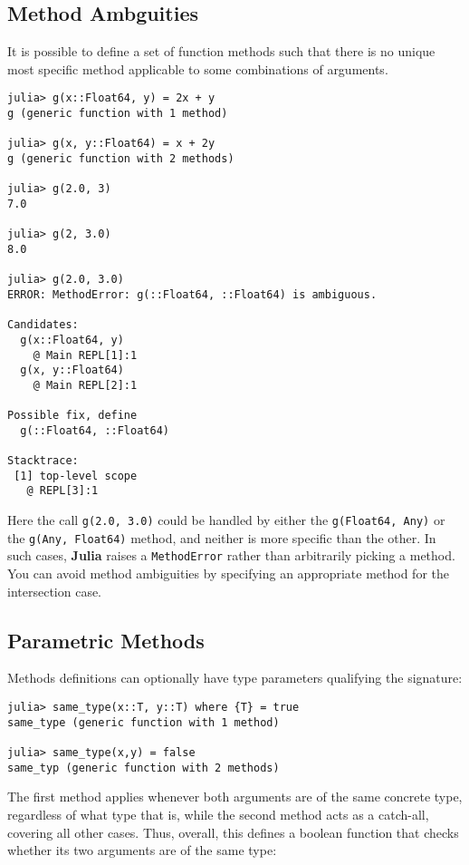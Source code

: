 \documentclass[
]{article}
\begin{document}
\hypertarget{method-ambguities}{%
\subsection{Method Ambguities}\label{method-ambguities}}

It is possible to define a set of function methods such that there is no
unique most specific method applicable to some combinations of
arguments.

\begin{verbatim}
julia> g(x::Float64, y) = 2x + y
g (generic function with 1 method)

julia> g(x, y::Float64) = x + 2y
g (generic function with 2 methods)

julia> g(2.0, 3)
7.0

julia> g(2, 3.0)
8.0

julia> g(2.0, 3.0)
ERROR: MethodError: g(::Float64, ::Float64) is ambiguous.

Candidates:
  g(x::Float64, y)
    @ Main REPL[1]:1
  g(x, y::Float64)
    @ Main REPL[2]:1

Possible fix, define
  g(::Float64, ::Float64)

Stacktrace:
 [1] top-level scope
   @ REPL[3]:1
\end{verbatim}

Here the call \texttt{g(2.0,\ 3.0)} could be handled by either the
\texttt{g(Float64,\ Any)} or the \texttt{g(Any,\ Float64)} method, and
neither is more specific than the other. In such cases, \textbf{Julia}
raises a \texttt{MethodError} rather than arbitrarily picking a method.
You can avoid method ambiguities by specifying an appropriate method for
the intersection case.

\hypertarget{parametric-methods}{%
\subsection{Parametric Methods}\label{parametric-methods}}

Methods definitions can optionally have type parameters qualifying the
signature:

\begin{verbatim}
julia> same_type(x::T, y::T) where {T} = true
same_type (generic function with 1 method)

julia> same_type(x,y) = false
same_typ (generic function with 2 methods)
\end{verbatim}

The first method applies whenever both arguments are of the same
concrete type, regardless of what type that is, while the second method
acts as a catch-all, covering all other cases. Thus, overall, this
defines a boolean function that checks whether its two arguments are of
the same type:
\end{document}
